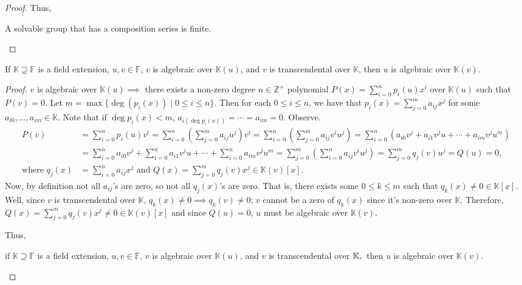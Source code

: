 \documentclass[addpoints,10pt]{exam}
\theoremstyle{plain}
\theoremstyle{definition}
\newtheorem{prob}[thm]{Problem}
\theoremstyle{plain}
\theoremstyle{plain}
\theoremstyle{definition}
\let\oldprob\prob
\let\endoldprob\endprob
\renewenvironment{prob}
  {\begin{singlespace}\oldprob}
  {\endoldprob\end{singlespace}}
\newcommand{\FF}{\ensuremath{\mathbb{F}}}
\newcommand{\KK}{\ensuremath{\mathbb{K}}}
\newcommand{\ZZ}{\ensuremath{\mathbb{Z}}}
\begin{document}
\begin{proof}
  Thus,
  \begin{center}
    A solvable group that has a composition series is finite.
  \end{center}
\end{proof}
\newpage
\setcounter{thm}{44}   %
\begin{prob}
If $\KK\supseteq \FF$ is a field extension, $u,v\in \FF$, $v$ is algebraic over $\KK(u)$, and $v$ is transcendental over $\KK$, then $u$ is algebraic 
over $\KK(v)$.
\end{prob}
\begin{proof}
$v$ is algebraic over $\KK(u)\implies$ there exists a non-zero degree $n\in \ZZ^{+}$ polynomial $P(x)=\sum_{i=0}^{n}p_{i}(u)x^{i}$ over $\KK(u)$ such that $P(v)=0$. Let $m=\max\{\deg(p_{i}(x))\mid 0\leq i \leq n\}$. Then for each $0\leq i \leq n$, we have that $p_{i}(x)= \sum_{j=0}^{m}a_{ij}x^{j}$ for some $a_{i0},\hdots,a_{im}\in \KK$. Note that if $\deg{p_{i}(x)}<m,\,a_{i(\deg{p_{i}(x)})}=\cdots =a_{im}=0$. Observe.
\begin{align*}
  P(v)&=\sum_{i=0}^{n}p_{i}(u)v^{i}=\sum_{i=0}^{n}(\sum_{j=0}^{m}a_{ij}u^{j})v^{i}=\sum_{i=0}^{n}(\sum_{j=0}^{m}a_{ij}v^{i}u^{j})=\sum_{i=0}^{n}(a_{i0}v^{j}+a_{i1}v^{j}u+\cdots +a_{im}v^{j}u^{m})\\
  &=\sum_{i=0}^{n}a_{i0}v^{j}+\sum_{i=0}^{n}a_{i1}v^{j}u+\cdots +\sum_{i=0}^{n}a_{im}v^{j}u^{m}=\sum_{j=0}^{m}(\sum_{i=0}^{n}a_{ij}v^{i}u^{j})=\sum_{j=0}^{m}q_{j}(v)u^{j}=Q(u)=0,\\
  \text{where }q_{j}(x)&=\sum_{i=0}^{n}a_{ij}x^{j}\text{ and }Q(x)=\sum_{j=0}^{m}q_{j}(v)x^{j}\in \KK(v)[x].
\end{align*}
Now, by definition not all $a_{ij}$'s are zero, so not all $q_{j}(x)$'s are zero. That is, there exists some $0\leq k\leq m$ such that $q_{k}(x)\neq 0\in \KK[x]$. Well, since $v$ is transcendental over $\KK$, $q_{k}(x)\neq 0\implies q_{k}(v)\neq 0$; $v$ cannot be a zero of $q_{k}(x)$ since it's non-zero over $\KK$. Therefore, $Q(x)=\sum_{j=0}^{m}q_{j}(v)x^{j}\neq 0\in \KK(v)[x]$ and since $Q(u)=0$, $u$ must be algebraic over $\KK(v)$.

Thus,
\begin{center}
if $\KK\supseteq \FF$ is a field extension, $u,v\in \FF$, $v$ is algebraic over $\KK(u)$, and $v$ is transcendental over $\KK,\newline$ then $u$ is algebraic 
over $\KK(v)$.
\end{center}
\end{proof}
\end{document}
